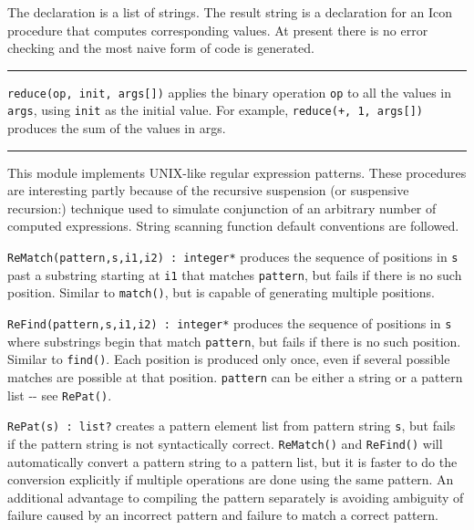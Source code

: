 The declaration is a list of strings. The result string is a
declaration for an Icon procedure that computes corresponding values.
At present there is no error checking and the most naive form of code
is generated. 

\vspace{0.25cm}\hrule{}

\texttt{reduce(op, init, args[])} applies the binary
operation \texttt{op} to all the values in \texttt{args}, using
\texttt{init} as the initial value. For example,
\texttt{reduce({\textquotedbl}+{\textquotedbl}, 1, args[])} produces
the sum of the values in args. 

\vspace{0.25cm}\hrule{}

This module implements UNIX-like regular
expression patterns. These procedures are interesting partly because of
the {\textquotedbl}recursive suspension{\textquotedbl} (or
{\textquotedbl}suspensive recursion{\textquotedbl}:)
technique used to simulate conjunction of an arbitrary number of
computed expressions. String scanning function
default conventions are followed.

\texttt{ReMatch(pattern,s,i1,i2) : integer*} produces the sequence of
positions in \texttt{s} past a substring starting at \texttt{i1} that
matches \texttt{pattern}, but fails if there is no such position.
Similar to \texttt{match()}, but is capable of generating multiple
positions.

\texttt{ReFind(pattern,s,i1,i2) : integer*} produces the sequence of
positions in \texttt{s} where substrings begin that match
\texttt{pattern}, but fails if there is no such position. Similar to
\texttt{find()}. Each position is produced only once, even if several
possible matches are possible at that position. \texttt{pattern} can be
either a string or a pattern list -{}- see \texttt{RePat()}.

\texttt{RePat(s) : list?} creates a pattern element list from pattern
string \texttt{s}, but fails if the pattern string is not syntactically
correct. \texttt{ReMatch()} and \texttt{ReFind()} will automatically
convert a pattern string to a pattern list, but it is faster to do the
conversion explicitly if multiple operations are done using the same
pattern. An additional advantage to compiling the pattern separately is
avoiding ambiguity of failure caused by an incorrect pattern and
failure to match a correct pattern.

